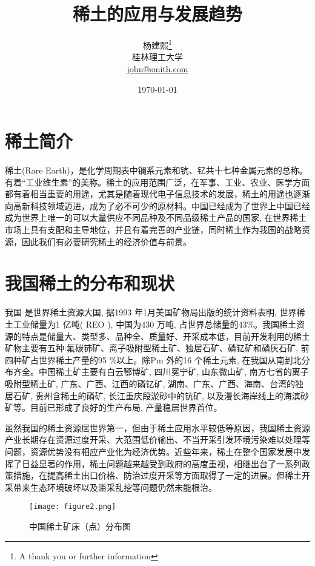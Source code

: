 \documentclass[twoside,twocolumn]{article}
\title{稀土的应用与发展趋势} %
\author{%
\textsc{杨建熙}\thanks{A thank you or further information} \\[1ex] %
\normalsize 桂林理工大学 \\ %
\normalsize \href{mailto:john@smith.com}{john@smith.com} %
}
\date{\today} %
\begin{document}
\maketitle


\section{稀土简介}
稀土(Rare Earth)，是化学周期表中镧系元素和钪、钇共十七种金属元素的总称。有着“工业维生素”的美称。稀土的应用范围广泛，在军事、工业、农业、医学方面都有着相当重要的用途，尤其是随着现代电子信息技术的发展，稀土的用途也逐渐向高新科技领域迈进，成为了必不可少的原材料。中国已经成为了世界上中国已经成为世界上唯一的可以大量供应不同品种及不同品级稀土产品的国家, 在世界稀土市场上具有支配和主导地位，并且有着完善的产业链，同时稀土作为我国的战略资源，因此我们有必要研究稀土的经济价值与前景。
\section{我国稀土的分布和现状}

\lettrine[nindent=0em,lines=3]{我}{国}
是世界稀土资源大国, 据1993 年1月美国矿物局出版的统计资料表明, 世界稀土工业储量为1 亿吨( REO ), 中国为430 万吨, 占世界总储量的43$\%$。我国稀土资源的特点是储量大、类型多、品种全、质量好、开采成本低，目前开发利用的稀土矿物主要有五种:氟碳铈矿、离子吸附型稀土矿、独居石矿、磷钇矿和磷灰石矿, 前四种矿占世界稀土产量的95 $\%$以上。除Pm 外的16 个稀土元素, 在我国从南到北分布齐全。中国稀土矿主要有白云鄂博矿, 四川冕宁矿, 山东微山矿, 南方七省的离子吸附型稀土矿, 广东、广西、江西的磷钇矿, 湖南、广东、广西、海南、台湾的独居石矿, 贵州含稀土的磷矿, 长江重庆段淤砂中的钪矿, 以及漫长海岸线上的海滨砂矿等。目前已形成了良好的生产布局, 产量稳居世界首位。

虽然我国的稀土资源居世界第一，但由于稀土应用水平较低等原因，我国稀土资源产业长期存在资源过度开采、大范围低价输出、不当开采引发环境污染难以处理等问题，资源优势没有相应产业化为经济优势。近些年来，稀土在整个国家发展中发挥了日益显著的作用，稀土问题越来越受到政府的高度重视，相继出台了一系列政策措施，在提高稀土出口价格、防治过度开采等方面取得了一定的进展。但稀土开采带来生态环境破坏以及滥采乱挖等问题仍然未能根治。
\begin{figure}[h]
  \centering
  \texttt{[image: figure2.png]}
  \caption{中国稀土矿床（点）分布图}
\end{figure}
\end{document}
